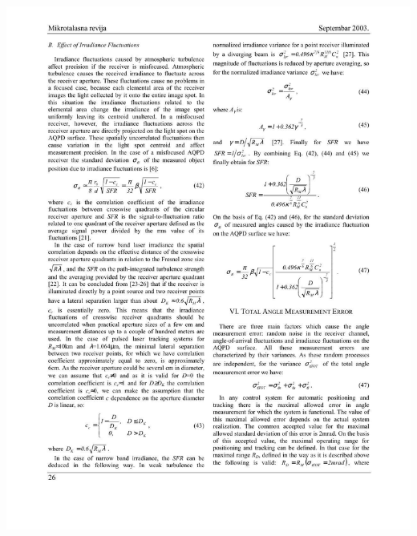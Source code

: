 \documentclass[10pt]{article}
\begin{document}
\includegraphics[max width=\textwidth]{d2750892714501b765cfde22b041f38a-08}
\end{document}
